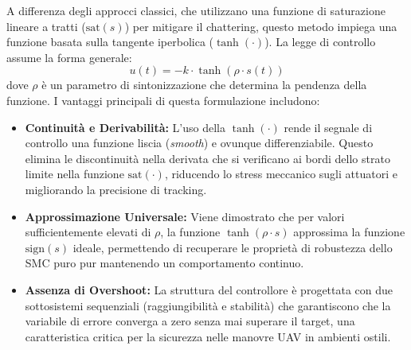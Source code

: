 A differenza degli approcci classici, che utilizzano una funzione di saturazione lineare a tratti ($\text{sat}(s)$) per mitigare il chattering, questo metodo impiega una funzione basata sulla tangente iperbolica ($\tanh(\cdot)$).
La legge di controllo assume la forma generale:
\begin{equation}
    u(t) = -k \cdot \tanh(\rho \cdot s(t))
\end{equation}
dove $\rho$ è un parametro di sintonizzazione che determina la pendenza della funzione.
I vantaggi principali di questa formulazione includono:
\begin{itemize}
    \item \textbf{Continuità e Derivabilità:} L'uso della $\tanh(\cdot)$ rende il segnale di controllo una funzione liscia (\textit{smooth}) e ovunque differenziabile. Questo elimina le discontinuità nella derivata che si verificano ai bordi dello strato limite nella funzione $\text{sat}(\cdot)$, riducendo lo stress meccanico sugli attuatori e migliorando la precisione di tracking.
    \item \textbf{Approssimazione Universale:} Viene dimostrato che per valori sufficientemente elevati di $\rho$, la funzione $\tanh(\rho \cdot s)$ approssima la funzione $\text{sign}(s)$ ideale, permettendo di recuperare le proprietà di robustezza dello SMC puro pur mantenendo un comportamento continuo.
    \item \textbf{Assenza di Overshoot:} La struttura del controllore è progettata con due sottosistemi sequenziali (raggiungibilità e stabilità) che garantiscono che la variabile di errore converga a zero senza mai superare il target, una caratteristica critica per la sicurezza nelle manovre UAV in ambienti ostili.
\end{itemize}

\clearpage
